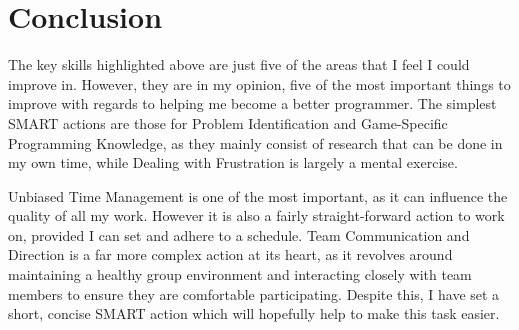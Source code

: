 \documentclass{scrartcl}
\begin{document}
\section{Conclusion}

The key skills highlighted above are just five of the areas that I feel I could improve in. However, they are in my opinion, five of the most important things to improve with regards to helping me become a better programmer. The simplest SMART actions are those for Problem Identification and Game-Specific Programming Knowledge, as they mainly consist of research that can be done in my own time, while Dealing with Frustration is largely a mental exercise. 

Unbiased Time Management is one of the most important, as it can influence the quality of all my work. However it is also a fairly straight-forward action to work on, provided I can set and adhere to a schedule. Team Communication and Direction is a far more complex action at its heart, as it revolves around maintaining a healthy group environment and interacting closely with team members to ensure they are comfortable participating. Despite this, I have set a short, concise SMART action which will hopefully help to make this task easier.




\end{document}
